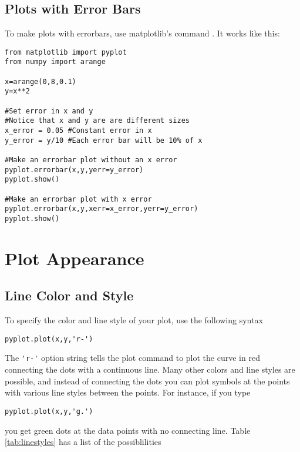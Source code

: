 \subsection{Plots with Error Bars}
To make plots with errorbars, use matplotlib's command . It works like this:
\begin{Verbatim}
from matplotlib import pyplot
from numpy import arange

x=arange(0,8,0.1)
y=x**2

#Set error in x and y
#Notice that x and y are are different sizes
x_error = 0.05 #Constant error in x
y_error = y/10 #Each error bar will be 10% of x

#Make an errorbar plot without an x error
pyplot.errorbar(x,y,yerr=y_error)
pyplot.show()

#Make an errorbar plot with x error
pyplot.errorbar(x,y,xerr=x_error,yerr=y_error)
pyplot.show()

\end{Verbatim}

\section{Plot Appearance}

\subsection*{Line Color and Style}

To specify the color and line style of your plot, use the following syntax
\begin{Verbatim}
pyplot.plot(x,y,'r-')
\end{Verbatim}
The \verb|'r-'| option string tells the plot command to plot the
curve in red connecting the dots with a continuous line. Many other
colors and line styles are possible, and instead of connecting the
dots you can plot symbols at the points with various line styles
between the points. For instance, if you type
\begin{Verbatim}
pyplot.plot(x,y,'g.')
\end{Verbatim}
you get green dots at the data points with no connecting line.  Table
\ref{tab:linestyles} has a list of the possiblilities



